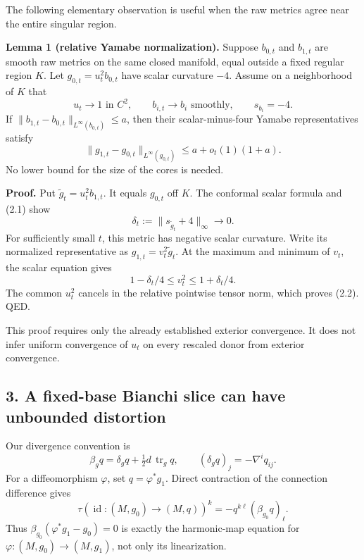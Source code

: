 \documentclass[
  11pt,
]{article}
\begin{document}
The following elementary observation is useful when the raw metrics
agree near the entire singular region.

\textbf{Lemma 1 (relative Yamabe normalization).} Suppose \(b_{0,t}\)
and \(b_{1,t}\) are smooth raw metrics on the same closed manifold,
equal outside a fixed regular region \(K\). Let \(g_{0,t}=u_t^2b_{0,t}\)
have scalar curvature \(-4\). Assume on a neighborhood of \(K\) that \[
 u_t\longrightarrow1\text{ in }C^2,\qquad
 b_{i,t}\longrightarrow b_i\text{ smoothly},\qquad s_{b_i}=-4.
                                                               \tag{2.1}
\] If \(\|b_{1,t}-b_{0,t}\|_{L^\infty(b_{0,t})}\le a\), then their
scalar-minus-four Yamabe representatives satisfy \[
 \|g_{1,t}-g_{0,t}\|_{L^\infty(g_{0,t})}\le a+o_t(1)(1+a).       \tag{2.2}
\] No lower bound for the size of the cores is needed.

\textbf{Proof.} Put \(\widetilde g_t=u_t^2b_{1,t}\). It equals
\(g_{0,t}\) off \(K\). The conformal scalar formula and (2.1) show \[
 \delta_t:=\|s_{\widetilde g_t}+4\|_\infty\longrightarrow0.
\] For sufficiently small \(t\), this metric has negative scalar
curvature. Write its normalized representative as
\(g_{1,t}=v_t^2\widetilde g_t\). At the maximum and minimum of \(v_t\),
the scalar equation gives \[
 1-\delta_t/4\le v_t^2\le1+\delta_t/4.                         \tag{2.3}
\] The common \(u_t^2\) cancels in the relative pointwise tensor norm,
which proves (2.2). QED.

This proof requires only the already established exterior convergence.
It does not infer uniform convergence of \(u_t\) on every rescaled donor
from exterior convergence.

\hypertarget{a-fixed-base-bianchi-slice-can-have-unbounded-distortion}{%
\subsection{3. A fixed-base Bianchi slice can have unbounded
distortion}\label{a-fixed-base-bianchi-slice-can-have-unbounded-distortion}}

Our divergence convention is \[
 \beta_g q=\delta_gq+\tfrac12d\,\operatorname{tr}_gq,\qquad
 (\delta_gq)_j=-\nabla^i q_{ij}.
\] For a diffeomorphism \(\varphi\), set \(q=\varphi^*g_1\). Direct
contraction of the connection difference gives \[
 \tau(\operatorname{id}:(M,g_0)\to(M,q))^k
       =-q^{k\ell}(\beta_{g_0}q)_\ell.                         \tag{3.1}
\] Thus \(\beta_{g_0}(\varphi^*g_1-g_0)=0\) is exactly the harmonic-map
equation for \(\varphi:(M,g_0)\to(M,g_1)\), not only its linearization.
\end{document}
